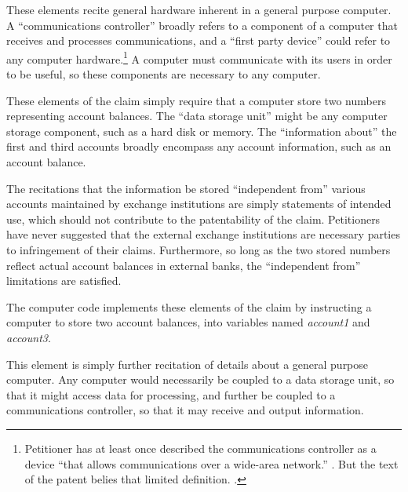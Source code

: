 \documentclass{scotus}
\begin{document}
These elements recite general hardware inherent in a general purpose computer. A
``communications controller'' broadly refers to a component of a computer that
receives and processes communications, and a ``first party device'' could refer
to any computer hardware.\footnote{Petitioner has at least once
described the communications controller as a device ``that allows communications
over a wide-area network.'' . But the text of the
patent belies that limited definition. .} A computer must communicate with its users in order to be useful,
so these components are necessary to any computer.


These elements of the claim simply require that a computer store two numbers
representing account balances. The ``data storage unit'' might be any computer
storage component, such as a hard disk or memory. The ``information about'' the
first and third accounts broadly encompass any account information, such as an
account balance.

The recitations that the information be stored ``independent from'' various
accounts maintained by exchange institutions are simply statements of intended
use, which should not contribute to the patentability of the claim. Petitioners
have never suggested that the external exchange institutions are necessary
parties to infringement of their claims. Furthermore, so long as the two stored
numbers reflect actual account balances in external banks, the ``independent
from'' limitations are satisfied.

The computer code implements these elements of the claim by instructing a
computer to store two account balances, into variables named \emph{account1} and
\emph{account3}.


This element is simply further recitation of details about a general purpose
computer. Any computer would necessarily be coupled to a data storage unit, so
that it might access data for processing, and further be coupled to a
communications controller, so that it may receive and output information.
\end{document}
